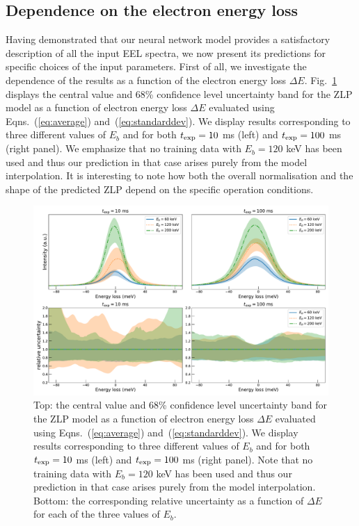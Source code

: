 \subsection{Dependence on the electron energy loss}
\label{eq:depdeltae}

Having demonstrated that our neural network model provides a satisfactory description
of all the input EEL spectra, we now present its  predictions for specific
choices of the input parameters.
%
First of all, we investigate the dependence of the results as a function of the
electron energy loss $\Delta E$.
%
Fig.~\ref{fig:EELS_vacuum_DeltaE} displays the central value and 68\% confidence level uncertainty band
for the ZLP model as a function
of electron energy loss $\Delta E$
evaluated using Eqns.~(\ref{eq:average}) and~(\ref{eq:standarddev}).
%
We display results corresponding to 
three different values of $E_b$  and for both
$t_{\rm exp}=10$ ms (left)  and $t_{\rm exp}=100$ ms (right panel).
%
We emphasize that no training data with $E_b=120$ keV has been used and thus our prediction
in that case arises purely from the model interpolation.
%
It is interesting to note how both the overall normalisation and the shape of
the predicted ZLP depend on the specific operation conditions.

\begin{figure}[t]
    \centering
    \includegraphics[width=170mm]{plots/deltaE_dependence_vacuum.pdf}
    \caption{\small Top: the central value and 68\% confidence level uncertainty band
      for the ZLP model as a function
      of electron energy loss $\Delta E$
      evaluated using Eqns.~(\ref{eq:average}) and~(\ref{eq:standarddev}).
      We display results corresponding to 
      three different values of $E_b$  and for both
      $t_{\rm exp}=10$ ms (left)  and $t_{\rm exp}=100$ ms (right panel).
      Note that no training data with $E_b=120$ keV has been used and thus our prediction
      in that case arises purely from the model interpolation.
      Bottom: the corresponding relative uncertainty as a function of $\Delta E$
      for each of the three values of $E_b$.
      \label{fig:EELS_vacuum_DeltaE}}
\end{figure}

